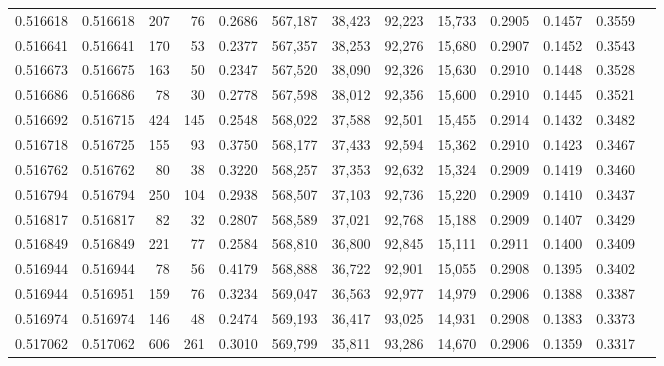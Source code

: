 \begin{tabular}{rrrrrrrrrrrrr}
0.516618 & 0.516618 &   207 &    76 &                                     0.2686 & 567,187 &  38,423 &  92,223 &  15,733 & 0.2905 & 0.1457 & 0.3559 \\
0.516641 & 0.516641 &   170 &    53 &                                     0.2377 & 567,357 &  38,253 &  92,276 &  15,680 & 0.2907 & 0.1452 & 0.3543 \\
0.516673 & 0.516675 &   163 &    50 &                                     0.2347 & 567,520 &  38,090 &  92,326 &  15,630 & 0.2910 & 0.1448 & 0.3528 \\
0.516686 & 0.516686 &    78 &    30 &                                     0.2778 & 567,598 &  38,012 &  92,356 &  15,600 & 0.2910 & 0.1445 & 0.3521 \\
0.516692 & 0.516715 &   424 &   145 &                                     0.2548 & 568,022 &  37,588 &  92,501 &  15,455 & 0.2914 & 0.1432 & 0.3482 \\
0.516718 & 0.516725 &   155 &    93 &                                     0.3750 & 568,177 &  37,433 &  92,594 &  15,362 & 0.2910 & 0.1423 & 0.3467 \\
0.516762 & 0.516762 &    80 &    38 &                                     0.3220 & 568,257 &  37,353 &  92,632 &  15,324 & 0.2909 & 0.1419 & 0.3460 \\
0.516794 & 0.516794 &   250 &   104 &                                     0.2938 & 568,507 &  37,103 &  92,736 &  15,220 & 0.2909 & 0.1410 & 0.3437 \\
0.516817 & 0.516817 &    82 &    32 &                                     0.2807 & 568,589 &  37,021 &  92,768 &  15,188 & 0.2909 & 0.1407 & 0.3429 \\
0.516849 & 0.516849 &   221 &    77 &                                     0.2584 & 568,810 &  36,800 &  92,845 &  15,111 & 0.2911 & 0.1400 & 0.3409 \\
0.516944 & 0.516944 &    78 &    56 &                                     0.4179 & 568,888 &  36,722 &  92,901 &  15,055 & 0.2908 & 0.1395 & 0.3402 \\
0.516944 & 0.516951 &   159 &    76 &                                     0.3234 & 569,047 &  36,563 &  92,977 &  14,979 & 0.2906 & 0.1388 & 0.3387 \\
0.516974 & 0.516974 &   146 &    48 &                                     0.2474 & 569,193 &  36,417 &  93,025 &  14,931 & 0.2908 & 0.1383 & 0.3373 \\
0.517062 & 0.517062 &   606 &   261 &                                     0.3010 & 569,799 &  35,811 &  93,286 &  14,670 & 0.2906 & 0.1359 & 0.3317 \\

\end{tabular}
